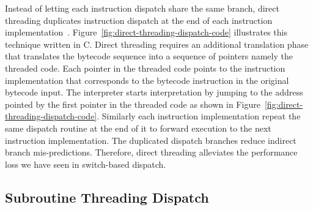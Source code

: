 Instead of letting each instruction dispatch share the same branch, direct threading duplicates instruction dispatch at the end of each instruction implementation~\cite{bell73,piumarta.riccardi+98}.
Figure~\ref{fig:direct-threading-dispatch-code} illustrates this technique written in C.
Direct threading requires an additional translation phase that translates the bytecode sequence into a sequence of pointers namely the threaded code.
Each pointer in the threaded code points to the instruction implementation that corresponds to the bytecode instruction in the original bytecode input.
The interpreter starts interpretation by jumping to the address pointed by the first pointer in the threaded code as shown in Figure~\ref{fig:direct-threading-dispatch-code}.
Similarly each instruction implementation repeat the same dispatch routine at the end of it to forward execution to the next instruction implementation.
The duplicated dispatch branches reduce indirect branch mis-predictions.
Therefore, direct threading alleviates the performance loss we have seen in switch-based dispatch.

\subsection{Subroutine Threading Dispatch}

